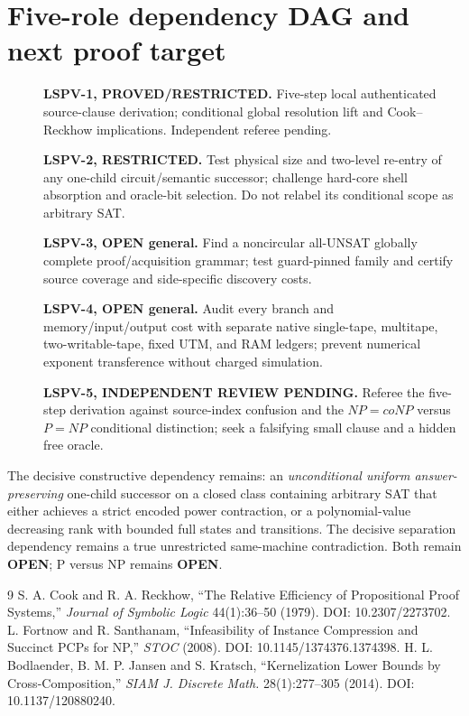 \documentclass[11pt]{article}
\begin{document}
\section{Five-role dependency DAG and next proof target}
\begin{description}
\item[]\textbf{LSPV-1, PROVED/RESTRICTED.} Five-step local authenticated source-clause derivation; conditional global resolution lift and Cook--Reckhow implications. Independent referee pending.
\item[]\textbf{LSPV-2, RESTRICTED.} Test physical size and two-level re-entry of any one-child circuit/semantic successor; challenge hard-core shell absorption and oracle-bit selection. Do not relabel its conditional scope as arbitrary SAT.
\item[]\textbf{LSPV-3, OPEN general.} Find a noncircular all-UNSAT globally complete proof/acquisition grammar; test guard-pinned family and certify source coverage and side-specific discovery costs.
\item[]\textbf{LSPV-4, OPEN general.} Audit every branch and memory/input/output cost with separate native single-tape, multitape, two-writable-tape, fixed UTM, and RAM ledgers; prevent numerical exponent transference without charged simulation.
\item[]\textbf{LSPV-5, INDEPENDENT REVIEW PENDING.} Referee the five-step derivation against source-index confusion and the $NP=coNP$ versus $P=NP$ conditional distinction; seek a falsifying small clause and a hidden free oracle.
\end{description}
The decisive constructive dependency remains: an \emph{unconditional uniform answer-preserving} one-child successor on a closed class containing arbitrary SAT that either achieves a strict encoded power contraction, or a polynomial-value decreasing rank with bounded full states and transitions. The decisive separation dependency remains a true unrestricted same-machine contradiction. Both remain \textbf{OPEN}; P versus NP remains \textbf{OPEN}.

\begin{thebibliography}{9}
 S. A. Cook and R. A. Reckhow, ``The Relative Efficiency of Propositional Proof Systems,'' \emph{Journal of Symbolic Logic} 44(1):36--50 (1979). DOI: 10.2307/2273702.
 L. Fortnow and R. Santhanam, ``Infeasibility of Instance Compression and Succinct PCPs for NP,'' \emph{STOC} (2008). DOI: 10.1145/1374376.1374398.
 H. L. Bodlaender, B. M. P. Jansen and S. Kratsch, ``Kernelization Lower Bounds by Cross-Composition,'' \emph{SIAM J. Discrete Math.} 28(1):277--305 (2014). DOI: 10.1137/120880240.
\end{thebibliography}
\end{document}
